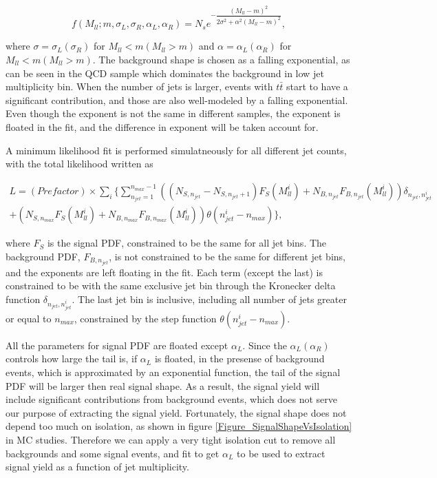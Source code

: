 \documentclass[10pt,a4paper,onecolumn]{article}
\begin{document}
\begin{equation}
f(M_{ll}; m, \sigma_L, \sigma_R, \alpha_L, \alpha_R) = N_s e^{-\dfrac{(M_{ll} - m)^2}{2 \sigma^2 + \alpha^2 (M_{ll} - m)^2}},\nonumber
\end{equation}

where $\sigma = \sigma_L (\sigma_R)$ for $M_{ll} < m (M_{ll} > m)$ and $\alpha = \alpha_L (\alpha_R)$ for $M_{ll} < m (M_{ll} > m)$.
The background shape is chosen as a falling exponential, as can be seen in the QCD sample which dominates the background in low
jet multiplicity bin.  When the number of jets is larger, events with $t\bar{t}$ start to have a significant contribution, and those are
also well-modeled by a falling exponential.
Even though the exponent is not the same in different samples, the exponent is floated in the fit, and the difference in exponent will be taken account for.

A minimum likelihood fit is performed simulatneously for all different jet counts, with the total likelihood written as

\begin{eqnarray}
L = (Prefactor) \times \displaystyle\sum_i \{ \displaystyle\sum_{n_{jet}=1}^{n_{max} - 1} \left( (N_{S, n_{jet}} - N_{S, n_{jet} + 1}) F_S(M_{ll}^i) + N_{B, n_{jet}} F_{B, n_{jet}}(M_{ll}^i) \right)
\delta_{n_{jet}, n_{jet}^i}\nonumber\\
+ \left( N_{S, n_{max}} F_S(M_{ll}^i) + N_{B, n_{max}} F_{B, n_{max}}(M_{ll}^i) \right) \theta(n_{jet}^i - n_{max}) \},
\nonumber
\end{eqnarray}

where $F_S$ is the signal PDF, constrained to be the same for all jet bins.  The background PDF, $F_{B, n_{jet}}$, is not constrained to
be the same for different jet bins, and the exponents are left floating in the fit.  Each term (except the last) is constrained to be with the same exclusive jet bin
through the Kronecker delta function $\delta_{n_{jet}, n_{jet}^i}$.
The last jet bin is inclusive, including all number of jets greater or equal to $n_{max}$, constrained by the step function $\theta(n_{jet}^i - n_{max})$.

All the parameters for signal PDF are floated except $\alpha_L$.  Since the $\alpha_L (\alpha_R)$ controls how large the tail is, if $\alpha_L$ is floated,
in the presense of background events, which is approximated by an exponential function, the tail of the signal PDF will be larger then real signal shape.
As a result, the signal yield will include significant contributions from background events, which does not serve our purpose of extracting the signal yield.
Fortunately, the signal shape does not depend too much on isolation, as shown in figure \ref{Figure_SignalShapeVsIsolation} in MC studies.
Therefore we can apply a very tight isolation cut to remove all backgrounds and some signal events, and fit to get $\alpha_L$ to be used to extract signal yield
as a function of jet multiplicity.
\end{document}
